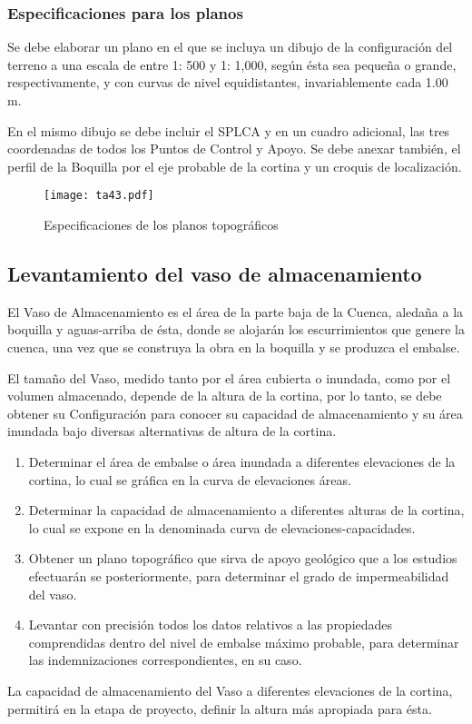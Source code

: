 \subsubsection{Especificaciones para los planos}

Se debe elaborar un plano en el que se incluya un dibujo de la configuración del terreno a una escala de entre 1: 500 y 1: 1,000, según ésta sea pequeña o grande, respectivamente, y con curvas de nivel equidistantes, invariablemente cada 1.00 m.

En el mismo dibujo se debe incluir el SPLCA y en un cuadro adicional, las tres coordenadas de todos los Puntos de Control y Apoyo. Se debe anexar también, el perfil de la Boquilla por el eje probable de la cortina y un croquis de localización.

\begin{figure}[h!]
\centering
  \texttt{[image: ta43.pdf]}
  \caption{Especificaciones de los planos topográficos}
  \label{ta43}
\end{figure}

\subsection{Levantamiento del vaso de almacenamiento}

El Vaso de Almacenamiento es el área de la parte baja de la Cuenca, aledaña a la boquilla y aguas-arriba de ésta, donde se alojarán los escurrimientos que genere la cuenca, una vez que se construya la obra en la boquilla y se produzca el embalse.

El tamaño del Vaso, medido tanto por el área cubierta o inundada, como por el volumen almacenado, depende de la altura de la cortina, por lo tanto, se debe obtener su Configuración para conocer su capacidad de almacenamiento y su área inundada bajo diversas alternativas de altura de la cortina.

\begin{enumerate}
    \item Determinar el área de embalse o área inundada a diferentes elevaciones de la cortina, lo cual se gráfica en la curva de elevaciones áreas.
    \item Determinar la capacidad de almacenamiento a diferentes alturas de la cortina, lo cual se expone en la denominada curva de elevaciones-capacidades.
    \item Obtener un plano topográfico que sirva de apoyo geológico que a los estudios efectuarán se posteriormente, para determinar el grado de impermeabilidad del vaso.    
    \item Levantar con precisión todos los datos relativos a las propiedades comprendidas dentro del nivel de embalse máximo probable, para determinar las indemnizaciones correspondientes, en su caso.
\end{enumerate}
La capacidad de almacenamiento del Vaso a diferentes elevaciones de la cortina, permitirá en la etapa de proyecto, definir la altura más apropiada para ésta.

